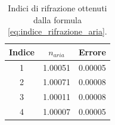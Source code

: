 \documentclass[letterpaper,12pt]{article}
\begin{document}
\begin{table}[h!]
    \centering
    \begin{tabular}{|c|c|c|}
    \hline
    \textbf{Indice} & \textbf{$n_{aria}$} & \textbf{Errore} \\
    \hline
    1 & \num{1.00051} & \num{0.00005} \\
    2 & \num{1.00071} & \num{0.00008} \\
    3 & \num{1.00011} & \num{0.00008} \\
    4 & \num{1.00007} & \num{0.00005} \\
    \hline
    \end{tabular}
    \caption{Indici di rifrazione ottenuti dalla formula \ref{eq:indice_rifrazione_aria}.}
    \label{tab:indice_rifrazione_aria}
\end{table}
\end{document}
